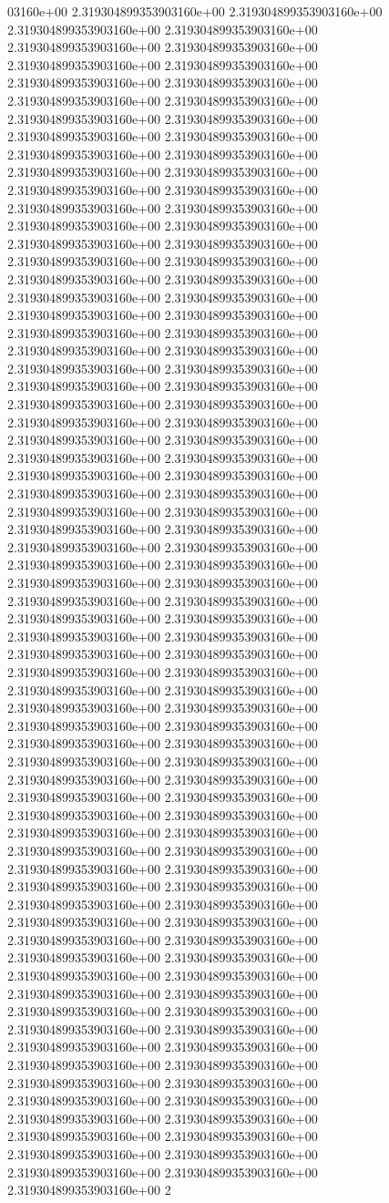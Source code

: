 03160e+00	2.319304899353903160e+00	2.319304899353903160e+00	2.319304899353903160e+00	2.319304899353903160e+00	2.319304899353903160e+00	2.319304899353903160e+00	2.319304899353903160e+00	2.319304899353903160e+00	2.319304899353903160e+00	2.319304899353903160e+00	2.319304899353903160e+00	2.319304899353903160e+00	2.319304899353903160e+00	2.319304899353903160e+00	2.319304899353903160e+00	2.319304899353903160e+00	2.319304899353903160e+00	2.319304899353903160e+00	2.319304899353903160e+00	2.319304899353903160e+00	2.319304899353903160e+00	2.319304899353903160e+00	2.319304899353903160e+00	2.319304899353903160e+00	2.319304899353903160e+00	2.319304899353903160e+00	2.319304899353903160e+00	2.319304899353903160e+00	2.319304899353903160e+00	2.319304899353903160e+00	2.319304899353903160e+00	2.319304899353903160e+00	2.319304899353903160e+00	2.319304899353903160e+00	2.319304899353903160e+00	2.319304899353903160e+00	2.319304899353903160e+00	2.319304899353903160e+00	2.319304899353903160e+00	2.319304899353903160e+00	2.319304899353903160e+00	2.319304899353903160e+00	2.319304899353903160e+00	2.319304899353903160e+00	2.319304899353903160e+00	2.319304899353903160e+00	2.319304899353903160e+00	2.319304899353903160e+00	2.319304899353903160e+00	2.319304899353903160e+00	2.319304899353903160e+00	2.319304899353903160e+00	2.319304899353903160e+00	2.319304899353903160e+00	2.319304899353903160e+00	2.319304899353903160e+00	2.319304899353903160e+00	2.319304899353903160e+00	2.319304899353903160e+00	2.319304899353903160e+00	2.319304899353903160e+00	2.319304899353903160e+00	2.319304899353903160e+00	2.319304899353903160e+00	2.319304899353903160e+00	2.319304899353903160e+00	2.319304899353903160e+00	2.319304899353903160e+00	2.319304899353903160e+00	2.319304899353903160e+00	2.319304899353903160e+00	2.319304899353903160e+00	2.319304899353903160e+00	2.319304899353903160e+00	2.319304899353903160e+00	2.319304899353903160e+00	2.319304899353903160e+00	2.319304899353903160e+00	2.319304899353903160e+00	2.319304899353903160e+00	2.319304899353903160e+00	2.319304899353903160e+00	2.319304899353903160e+00	2.319304899353903160e+00	2.319304899353903160e+00	2.319304899353903160e+00	2.319304899353903160e+00	2.319304899353903160e+00	2.319304899353903160e+00	2.319304899353903160e+00	2.319304899353903160e+00	2.319304899353903160e+00	2.319304899353903160e+00	2.319304899353903160e+00	2.319304899353903160e+00	2.319304899353903160e+00	2.319304899353903160e+00	2.319304899353903160e+00	2.319304899353903160e+00	2.319304899353903160e+00	2.319304899353903160e+00	2.319304899353903160e+00	2.319304899353903160e+00	2.319304899353903160e+00	2.319304899353903160e+00	2.319304899353903160e+00	2.319304899353903160e+00	2.319304899353903160e+00	2.319304899353903160e+00	2.319304899353903160e+00	2.319304899353903160e+00	2.319304899353903160e+00	2.319304899353903160e+00	2.319304899353903160e+00	2.319304899353903160e+00	2.319304899353903160e+00	2.319304899353903160e+00	2.319304899353903160e+00	2.319304899353903160e+00	2.319304899353903160e+00	2.319304899353903160e+00	2.319304899353903160e+00	2.319304899353903160e+00	2.319304899353903160e+00	2.319304899353903160e+00	2.319304899353903160e+00	2.319304899353903160e+00	2.319304899353903160e+00	2.319304899353903160e+00	2.319304899353903160e+00	2.319304899353903160e+00	2.319304899353903160e+00	2.319304899353903160e+00	2